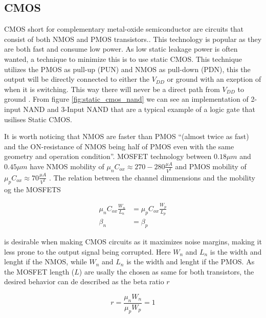 \subsection{CMOS}
CMOS short for complementary metal-oxide semiconductor are circuits that consist of both NMOS and PMOS transistors.\cite[p. 14]{carusone_2012_analog}. This technology is popular as they are both fast and consume low power. As low static leakage power is often wanted, a technique to minimize this is to use static CMOS. This technique utilizes the PMOS as pull-up (PUN) and NMOS as pull-down (PDN), this the output will be directly connected to either the $V_{DD}$ or ground with an exeption of when it is switching. This way there will never be a direct path from $V_{DD}$ to ground \cite{a2018}. From figure \ref{fig:static_cmos_nand} we can see an implementation of 2-input NAND and 3-Input NAND that are a typical example of a logic gate that usilises Static CMOS.


It is worth noticing that NMOS are faster than PMOS ``(almost twice as fast) and the ON-resistance of NMOS being half of PMOS even with the same geometry and operation condition''\cite{kusumitha_2019_why}. MOSFET technology between $0.18\mu m$ and $0.45\mu m$ have NMOS mobility of $\mu_nC_{ox}\approx 270-280 \frac{\mu A}{V^2}$ and PMOS mobility of $\mu_pC_{ox}\approx 70 \frac{\mu A}{V^2}$ \cite{carusone_2012_analog}. The relation between the channel dimmensions and the mobility og the MOSFETS

\begin{align}
    \mu_nC_{ox}\frac{W_n}{L_n}&=\mu_pC_{ox}\frac{W_p}{L_p}\\
    \beta_n&=\beta_p
    \label{eq:beta_ratio}
\end{align}

is desirable when making CMOS circuits as it maximizes noise margins, making it less prone to the output signal being corrupted. Here $W_n$ and $L_n$ is the width and lenght if the NMOS, while $W_n$ and $L_n$ is the width and lenght if the PMOS. As the MOSFET length ($L$) are usally the chosen as same for both transistors, the desired behavior can de described as the beta ratio $r$ \cite[p. 90]{neilheweste_2015_cmos}

\begin{equation}
    r=\frac{\mu_n W_n}{\mu_p W_p}=1
    \label{eq:betaratio}
\end{equation}

